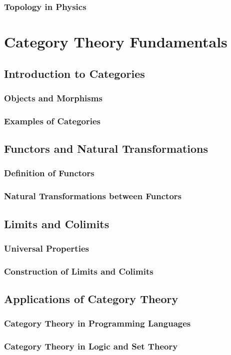 \subsubsection{Topology in Physics}

\section{Category Theory Fundamentals}
\lipsum
\subsection{Introduction to Categories}
\subsubsection{Objects and Morphisms}
\subsubsection{Examples of Categories}
\subsection{Functors and Natural Transformations}
\subsubsection{Definition of Functors}
\subsubsection{Natural Transformations between Functors}
\subsection{Limits and Colimits}
\subsubsection{Universal Properties}
\subsubsection{Construction of Limits and Colimits}
\subsection{Applications of Category Theory}
\subsubsection{Category Theory in Programming Languages}
\subsubsection{Category Theory in Logic and Set Theory}